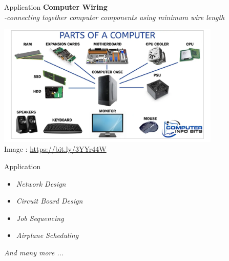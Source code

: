 \documentclass{beamer}
\begin{document}
\begin{frame}{Application}
\textbf{Computer Wiring}\\
\textit{-connecting together computer 			         	         	              components using minimum wire length}\\


\begin{center}
\includegraphics[width = 0.8\textwidth]{tsp.PNG}\\
Image : \href{https:https://computerinfobits.com/parts-of-computer-and-their-functions/}{https://bit.ly/3YYr44W}
\end{center}
\end{frame}

\begin{frame}{Application}

\begin{itemize}
    \item \textit{ Network Design}\\
    \item \textit{ Circuit Board Design}\\
    \item \textit{Job Sequencing}\\
    \item \textit{Airplane Scheduling}\\
  
\end{itemize}

  \item \textit{And many more ...}\\

\end{frame}
\end{document}
